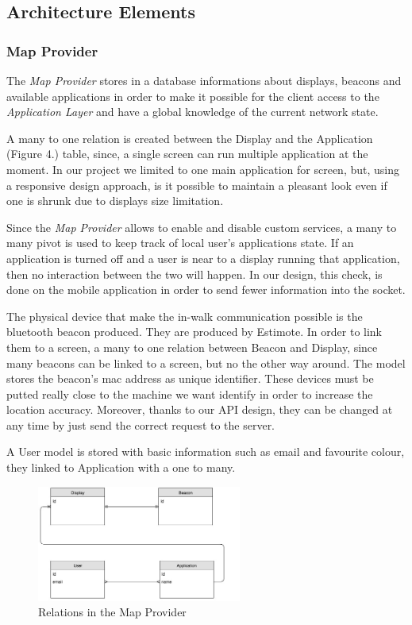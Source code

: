 \documentclass[]{usiinfbachelorproject}
\begin{document}
%
\subsection{Architecture Elements}
\subsubsection{Map Provider}
The \emph{Map Provider} stores in a database informations about displays, beacons and available applications in order to make it possible for the client access to the \emph{Application Layer} and have a global knowledge of the current network state. 

A many to one relation is created between the Display and the Application (Figure 4.) table, since, a single screen can run multiple application at the moment. In our project we limited to one main application for screen, but, using a responsive design approach, is it possible to maintain a pleasant look even if one is shrunk due to displays size limitation.

Since the \emph{Map Provider} allows to enable and disable custom services, a many to many pivot is used to keep track of local user's applications state. If an application is turned off and a user is near to a display running that application, then no interaction between the two will happen. In our design, this check, is done on the mobile application in order to send fewer information into the socket.

The physical device that make the in-walk communication possible is the bluetooth beacon produced. They are produced by Estimote. In order to link them to a screen, a many to one relation between Beacon and Display, since many beacons can be linked to a screen, but no the other way around. The model stores the beacon's mac address as unique identifier. These devices must be putted really close to the machine we want identify in order to increase the location accuracy. Moreover, thanks to our API design, they can be changed at any time by just send the correct request to the server.

A User model is stored with basic information such as email and favourite colour, they linked to Application with a one to many. 
\begin{figure}[H]
  \centering
  \includegraphics[width=0.6\textwidth]{./images/TacitaRelations.jpg}
   \caption{Relations in the Map Provider}

\end{figure} 
\end{document}

